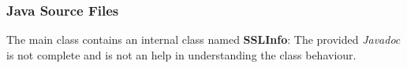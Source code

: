 \subsubsection{Java Source Files}
\begin{itemize}
		The main class contains an internal class named \textbf{SSLInfo}:
	The provided \textit{Javadoc} is not complete and is not an help in understanding the class behaviour.
\end{itemize}
%
%
